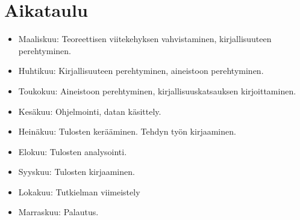 \documentclass[utf8]{gradu3}
\begin{document}
%
\chapter{Aikataulu}
\begin{itemize}
  \item Maaliskuu: Teoreettisen viitekehyksen vahvistaminen, kirjallisuuteen perehtyminen.
  \item Huhtikuu:  Kirjallisuuteen perehtyminen, aineistoon perehtyminen.
  \item Toukokuu:  Aineistoon perehtyminen, kirjallisuuskatsauksen kirjoittaminen.
  \item Kesäkuu:   Ohjelmointi, datan käsittely.
  \item Heinäkuu:  Tulosten kerääminen. Tehdyn työn kirjaaminen.
  \item Elokuu:    Tulosten analysointi.
  \item Syyskuu:   Tulosten kirjaaminen.
  \item Lokakuu:   Tutkielman viimeistely
  \item Marraskuu: Palautus.
\end{itemize}

\printbibliography
\end{document}
